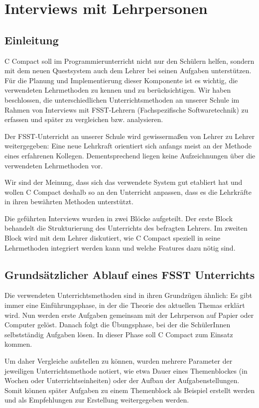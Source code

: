 \section{Interviews mit Lehrpersonen}
\label{sec:sci-interview}

\subsection{Einleitung}
C Compact soll im Programmierunterricht nicht nur den Schülern helfen, sondern mit dem neuen Questsystem auch dem Lehrer bei seinen Aufgaben unterstützen. Für die Planung und Implementierung dieser Komponente ist es wichtig, die verwendeten Lehrmethoden zu kennen und zu berücksichtigen. Wir haben beschlossen, die unterschiedlichen Unterrichtsmethoden an unserer Schule im Rahmen von Interviews mit FSST-Lehrern (Fachspezifische Softwaretechnik) zu erfassen und später zu vergleichen bzw. analysieren. 

Der FSST-Unterricht an unserer Schule wird gewissermaßen von Lehrer zu Lehrer weitergegeben:
Eine neue Lehrkraft orientiert sich anfangs meist an der Methode eines erfahrenen Kollegen. Dementsprechend liegen keine Aufzeichnungen über die verwendeten Lehrmethoden vor. 

Wir sind der Meinung, dass sich das verwendete System gut etabliert hat und wollen C Compact deshalb so an den Unterricht anpassen, dass es die Lehrkräfte in ihren bewährten Methoden unterstützt.

Die geführten Interviews wurden in zwei Blöcke aufgeteilt. Der erste Block behandelt die Strukturierung des Unterrichts des befragten Lehrers. Im zweiten Block wird mit dem Lehrer diskutiert, wie C Compact speziell in seine Lehrmethoden integriert werden kann und welche Features dazu nötig sind.

\subsection{Grundsätzlicher Ablauf eines FSST Unterrichts}
Die verwendeten Unterrichtsmethoden sind in ihren Grundzügen ähnlich: Es gibt immer eine Einführungsphase, in der die Theorie des aktuellen Themas erklärt wird. Nun werden erste Aufgaben gemeinsam mit der Lehrperson auf Papier oder Computer gelöst. Danach folgt die Übungsphase, bei der die SchülerInnen selbstständig Aufgaben lösen. In dieser Phase soll C Compact zum Einsatz kommen.

Um daher Vergleiche aufstellen zu können, wurden mehrere Parameter der jeweiligen Unterrichtsmethode notiert, wie etwa Dauer eines Themenblockes (in Wochen oder Unterrichtseinheiten) oder der Aufbau der Aufgabenstellungen. Somit können später Aufgaben zu einem Themenblock als Beispiel erstellt werden und als Empfehlungen zur Erstellung weitergegeben werden.

